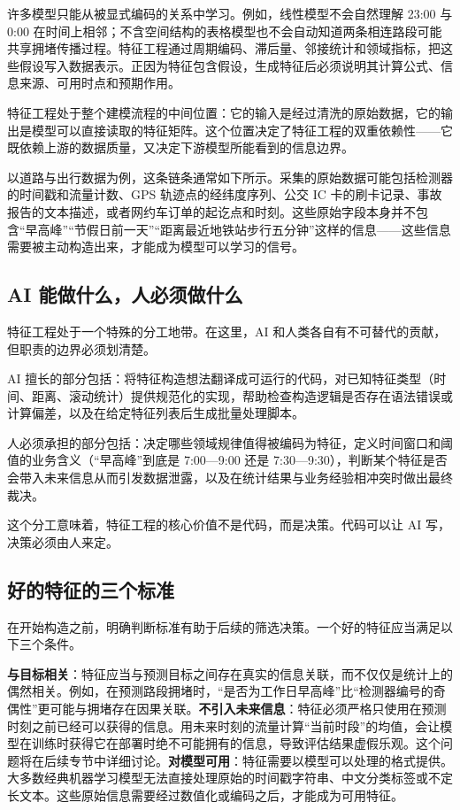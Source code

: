 许多模型只能从被显式编码的关系中学习。例如，线性模型不会自然理解 23:00 与 0:00 在时间上相邻；不含空间结构的表格模型也不会自动知道两条相连路段可能共享拥堵传播过程。特征工程通过周期编码、滞后量、邻接统计和领域指标，把这些假设写入数据表示。正因为特征包含假设，生成特征后必须说明其计算公式、信息来源、可用时点和预期作用。

特征工程处于整个建模流程的中间位置：它的输入是经过清洗的原始数据，它的输出是模型可以直接读取的特征矩阵。这个位置决定了特征工程的双重依赖性——它既依赖上游的数据质量，又决定下游模型所能看到的信息边界。

以道路与出行数据为例，这条链条通常如下所示。采集的原始数据可能包括检测器的时间戳和流量计数、GPS 轨迹点的经纬度序列、公交 IC 卡的刷卡记录、事故报告的文本描述，或者网约车订单的起讫点和时刻。这些原始字段本身并不包含“早高峰”“节假日前一天”“距离最近地铁站步行五分钟”这样的信息——这些信息需要被主动构造出来，才能成为模型可以学习的信号。

\subsection{AI 能做什么，人必须做什么}

特征工程处于一个特殊的分工地带。在这里，AI 和人类各自有不可替代的贡献，但职责的边界必须划清楚。

AI 擅长的部分包括：将特征构造想法翻译成可运行的代码，对已知特征类型（时间、距离、滚动统计）提供规范化的实现，帮助检查构造逻辑是否存在语法错误或计算偏差，以及在给定特征列表后生成批量处理脚本。

人必须承担的部分包括：决定哪些领域规律值得被编码为特征，定义时间窗口和阈值的业务含义（“早高峰”到底是 7:00—9:00 还是 7:30—9:30），判断某个特征是否会带入未来信息从而引发数据泄露，以及在统计结果与业务经验相冲突时做出最终裁决。

这个分工意味着，特征工程的核心价值不是代码，而是决策。代码可以让 AI 写，决策必须由人来定。

\subsection{好的特征的三个标准}

在开始构造之前，明确判断标准有助于后续的筛选决策。一个好的特征应当满足以下三个条件。

\textbf{与目标相关}：特征应当与预测目标之间存在真实的信息关联，而不仅仅是统计上的偶然相关。例如，在预测路段拥堵时，“是否为工作日早高峰”比“检测器编号的奇偶性”更可能与拥堵存在因果关联。\textbf{不引入未来信息}：特征必须严格只使用在预测时刻之前已经可以获得的信息。用未来时刻的流量计算“当前时段”的均值，会让模型在训练时获得它在部署时绝不可能拥有的信息，导致评估结果虚假乐观。这个问题将在后续专节中详细讨论。\textbf{对模型可用}：特征需要以模型可以处理的格式提供。大多数经典机器学习模型无法直接处理原始的时间戳字符串、中文分类标签或不定长文本。这些原始信息需要经过数值化或编码之后，才能成为可用特征。

